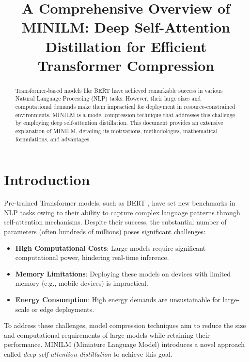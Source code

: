 \documentclass{article}
\begin{document}
  
  
\title{A Comprehensive Overview of MINILM: Deep Self-Attention Distillation for Efficient Transformer Compression}  
\author{}  
\date{}  
\maketitle  
  
\begin{abstract}  
Transformer-based models like BERT have achieved remarkable success in various Natural Language Processing (NLP) tasks. However, their large sizes and computational demands make them impractical for deployment in resource-constrained environments. MINILM is a model compression technique that addresses this challenge by employing deep self-attention distillation. This document provides an extensive explanation of MINILM, detailing its motivations, methodologies, mathematical formulations, and advantages.  
\end{abstract}  
  
\tableofcontents  
  
\section{Introduction}  
  
Pre-trained Transformer models, such as BERT \cite{devlin2018bert}, have set new benchmarks in NLP tasks owing to their ability to capture complex language patterns through self-attention mechanisms. Despite their success, the substantial number of parameters (often hundreds of millions) poses significant challenges:  
  
\begin{itemize}  
    \item \textbf{High Computational Costs}: Large models require significant computational power, hindering real-time inference.  
    \item \textbf{Memory Limitations}: Deploying these models on devices with limited memory (e.g., mobile devices) is impractical.  
    \item \textbf{Energy Consumption}: High energy demands are unsustainable for large-scale or edge deployments.  
\end{itemize}  
  
To address these challenges, model compression techniques aim to reduce the size and computational requirements of large models while retaining their performance. MINILM (Miniature Language Model) introduces a novel approach called \textit{deep self-attention distillation} to achieve this goal.  
  
\end{document}
